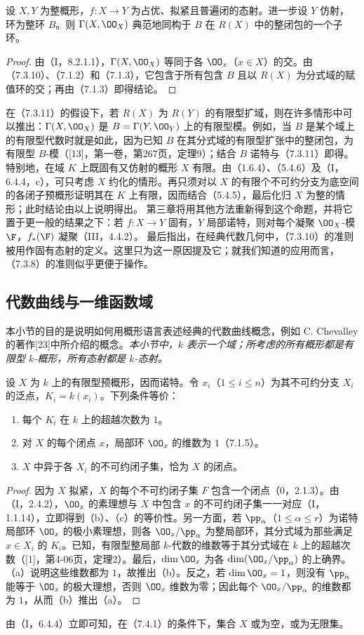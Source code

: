 设 $X,Y$ 为整概形，$f:X\to Y$ 为占优、拟紧且普遍闭的态射。进一步设 $Y$ 仿射，环为整环 $B$。则 $\Gamma(X,\OO_X)$ 典范地同构于 $B$ 在 $R(X)$ 中的整闭包的一个子环。
\begin{proof}
由（I，8.2.1.1），$\Gamma(X,\OO_X)$ 等同于各 $\OO_x$（$x\in X$）的交。由（7.3.10）、（7.1.2）和（7.1.3），它包含于所有包含 $B$ 且以 $R(X)$ 为分式域的赋值环的交；再由（7.1.3）即得结论。
\end{proof}

在（7.3.11）的假设下，若 $R(X)$ 为 $R(Y)$ 的有限型扩域，则在许多情形中可以推出：$\Gamma(X,\OO_X)$ 是 $B=\Gamma(Y,\OO_Y)$ 上的有限型模。例如，当 $B$ 是某个域上的有限型代数时就是如此，因为已知 $B$ 在其分式域的有限型扩张中的整闭包，为有限型 $B$-模（[13]，第一卷，第267页，定理9）；结合 $B$ 诺特与（7.3.11）即得。
特别地，在域 $K$ 上既固有又仿射的概形 $X$ 有限。由（1.6.4）、（5.4.6）及（I，6.4.4，c），可只考虑 $X$ 约化的情形。再只须对以 $X$ 的有限个不可约分支为底空间的各闭子预概形证明其在 $K$ 上有限，因而结合（5.4.5），最后化归 $X$ 为整的情形；此时结论由以上说明得出。
第三章将用其他方法重新得到这个命题，并将它置于更一般的结果之下：若 $f:X\to Y$ 固有，$Y$ 局部诺特，则对每个凝聚 $\OO_X$-模 $\F$，$f_*(\F)$ 凝聚（III，4.4.2）。
最后指出，在经典代数几何中，（7.3.10）的准则被用作固有态射的定义。这里只为这一原因提及它；就我们知道的应用而言，（7.3.8）的准则似乎更便于操作。

\subsection{代数曲线与一维函数域}
本小节的目的是说明如何用概形语言表述经典的代数曲线概念，例如 C. Chevalley 的著作[23]中所介绍的概念。\emph{本小节中，$k$ 表示一个域；所考虑的所有概形都是有限型 $k$-概形，所有态射都是 $k$-态射。}

设 $X$ 为 $k$ 上的有限型预概形，因而诺特。令 $x_i$（$1\leq i\leq n$）为其不可约分支 $X_i$ 的泛点，$K_i=k(x_i)$。下列条件等价：
\begin{enumerate}[label=\alph*)]
\item 每个 $K_i$ 在 $k$ 上的超越次数为 $1$。
\item 对 $X$ 的每个闭点 $x$，局部环 $\OO_x$ 的维数为 $1$（7.1.5）。
\item $X$ 中异于各 $X_i$ 的不可约闭子集，恰为 $X$ 的闭点。
\end{enumerate}
\begin{proof}
因为 $X$ 拟紧，$X$ 的每个不可约闭子集 $F$ 包含一个闭点（0，2.1.3）。由（I，2.4.2），$\OO_x$ 的素理想与 $X$ 中包含 $x$ 的不可约闭子集一一对应（I，1.1.14），立即得到（b）、（c）的等价性。另一方面，若 $\pp_\alpha$（$1\leq\alpha\leq r$）为诺特局部环 $\OO_x$ 的极小素理想，则各 $\OO_x/\pp_\alpha$ 为整局部环，其分式域为那些满足 $x\in X_i$ 的 $K_i$。已知，有限型整局部 $k$-代数的维数等于其分式域在 $k$ 上的超越次数（[1]，第4-06页，定理2）。最后，$\dim\OO_x$ 为各 $\dim(\OO_x/\pp_\alpha)$ 的上确界。（a）说明这些维数都为 $1$，故推出（b）。反之，若 $\dim\OO_x=1$，则没有 $\pp_\alpha$ 能等于 $\OO_x$ 的极大理想，否则 $\OO_x$ 维数为零；因此每个 $\OO_x/\pp_\alpha$ 的维数都为 $1$，从而（b）推出（a）。
\end{proof}
由（I，6.4.4）立即可知，在（7.4.1）的条件下，集合 $X$ 或为空，或为无限集。

